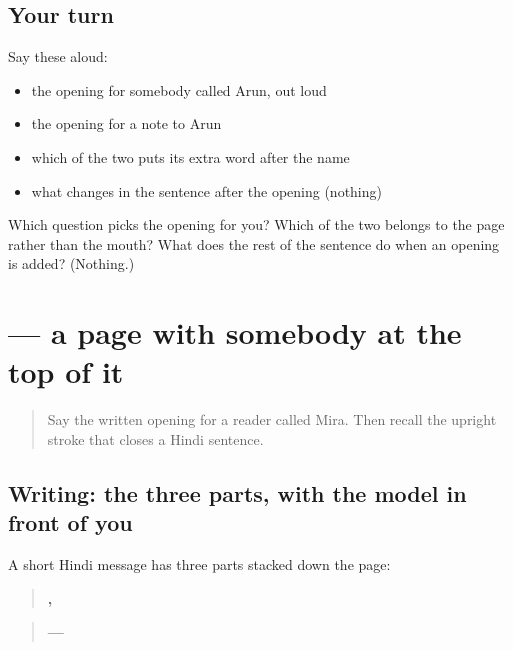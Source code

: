 \subsection*{Your turn}
Say these aloud:

\begin{itemize}
\raggedright
  \item the opening for somebody called Arun, out loud
  \item the opening for a note to Arun
  \item which of the two puts its extra word after the name
  \item what changes in the sentence after the opening (nothing)
\end{itemize}

\begin{tcolorbox}[breakable,colback=teal!4,colframe=teal!35!black,title={Before you move on}]
Which question picks the opening for you? Which of the two belongs to the page rather than the mouth? What does the rest of the sentence do when an opening is added? (Nothing.)
\end{tcolorbox}
\section[\texorpdfstring{\hi{प्रिय} \hi{मीरा}, (priya Mīrā,)}{प्रिय मीरा, (priya Mīrā,)}]{  — a page with somebody at the top of it}

\label{lesson:HI-C97-sandesh}



\begin{quote}
Say the written opening for a reader called Mira. Then recall the upright stroke that closes a Hindi sentence.
\end{quote}

\subsection*{Writing: the three parts, with the model in front of you}
A short Hindi message has three parts stacked down the page:

\begin{quote}
\textbf{ ,}
\end{quote}

\begin{quote}
\textbf{   }
\end{quote}

\begin{quote}
\textbf{— }
\end{quote}

